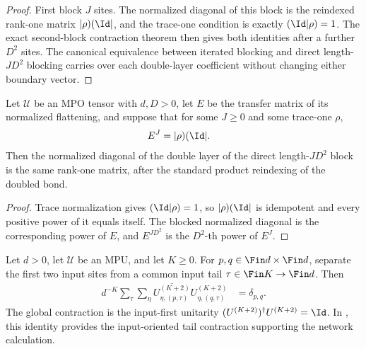 \begin{proof}\leanok
    First block $J$ sites.  The normalized diagonal of this block is the
    reindexed rank-one matrix $|\rho)(\Id|$, and the trace-one condition is
    exactly $(\Id|\rho)=1$.  The exact second-block contraction theorem then
    gives both identities after a further $D^2$ sites.  The canonical
    equivalence between iterated blocking and direct length-$JD^2$ blocking
    carries over each double-layer coefficient without changing either boundary
    vector.
\end{proof}

\begin{lemma}
    \label{thm:mpu_blocked_transfer_power_rank_one}
    \leanok
    Let $\mathcal U$ be an MPO tensor with $d,D>0$, let $E$ be the transfer
    matrix of its normalized flattening, and suppose that for some $J\geq0$
    and some trace-one $\rho$,
    \begin{align}
        E^J & =|\rho)(\Id|.
    \end{align}
    Then the normalized diagonal of the double layer of the direct
    length-$JD^2$ block is the same rank-one matrix, after the standard product
    reindexing of the doubled bond.
\end{lemma}

\begin{proof}\leanok
    Trace normalization gives $(\Id|\rho)=1$, so $|\rho)(\Id|$ is idempotent
    and every positive power of it equals itself.  The blocked normalized
    diagonal is the corresponding power of $E$, and $E^{JD^2}$ is the $D^2$-th
    power of $E^J$.
\end{proof}

\begin{lemma}
    \label{thm:mpu_normalized_input_tail_isometry}
    \leanok
    Let $d>0$, let $\mathcal U$ be an MPU, and let $K\geq0$.  For
    $p,q\in\Fin d\times\Fin d$, separate the first two input sites from a
    common input tail $\tau\in\Fin K\to\Fin d$.  Then
    \begin{align}
        d^{-K}\sum_{\tau}\sum_{\eta}
        \overline{U^{(K+2)}_{\eta,(p,\tau)}}
        U^{(K+2)}_{\eta,(q,\tau)}
         & =\delta_{p,q}.
    \end{align}
    The global contraction is the input-first unitarity
    $(U^{(K+2)})^\dagger U^{(K+2)}=\Id$.  In \cite[Theorem~III.8, Section~III.B, equations~(31)--(32)]{Cirac2017MPU}, this identity provides the input-oriented tail
    contraction supporting the network
    calculation.
\end{lemma}

